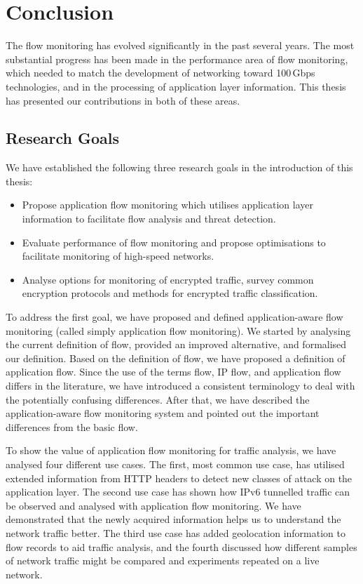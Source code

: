 \chapter{Conclusion}\label{chap:conclusions}

The flow monitoring has evolved significantly in the past several years. The most substantial progress has been made in the performance area of flow monitoring, which needed to match the development of networking toward 100\,Gbps technologies, and in the processing of application layer information. This thesis has presented our contributions in both of these areas. 

\section{Research Goals}

We have established the following three research goals in the introduction of this thesis:
\begin{itemize}
  \item Propose application flow monitoring which utilises application layer information to facilitate flow analysis and threat detection.
  \item Evaluate performance of flow monitoring and propose optimisations to facilitate monitoring of high-speed networks.
  \item Analyse options for monitoring of encrypted traffic, survey common encryption protocols and methods for encrypted traffic classification.
\end{itemize}

To address the first goal, we have proposed and defined application-aware flow monitoring (called simply application flow monitoring). We started by analysing the current definition of flow, provided an improved alternative, and formalised our definition. Based on the definition of flow, we have proposed a definition of application flow. Since the use of the terms flow, IP flow, and application flow differs in the literature, we have introduced a consistent terminology to deal with the potentially confusing differences. After that, we have described the application-aware flow monitoring system and pointed out the important differences from the basic flow. 

To show the value of application flow monitoring for traffic analysis, we have analysed four different use cases. The first, most common use case, has utilised extended information from HTTP headers to detect new classes of attack on the application layer. The second use case has shown how IPv6 tunnelled traffic can be observed and analysed with application flow monitoring. We have demonstrated that the newly acquired information helps us to understand the network traffic better. The third use case has added geolocation information to flow records to aid traffic analysis, and the fourth discussed how different samples of network traffic might be compared and experiments repeated on a live network.

